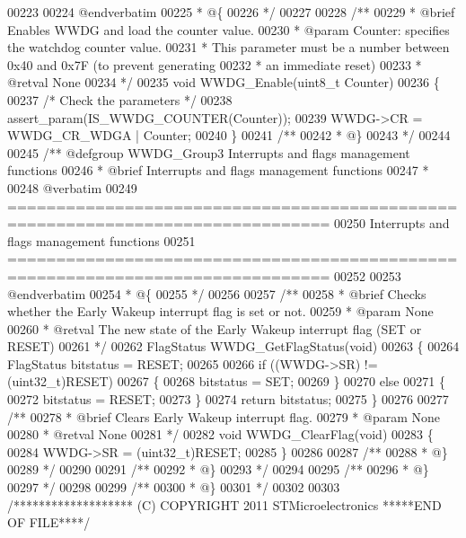 \begin{DoxyCode}
00223 \textcolor{comment}{}
00224 \textcolor{comment}{@endverbatim}
00225 \textcolor{comment}{  * @\{}
00226 \textcolor{comment}{  */}
00227 
00228 \textcolor{comment}{/**}
00229 \textcolor{comment}{  * @brief  Enables WWDG and load the counter value.                  }
00230 \textcolor{comment}{  * @param  Counter: specifies the watchdog counter value.}
00231 \textcolor{comment}{  *   This parameter must be a number between 0x40 and 0x7F (to prevent generating}
00232 \textcolor{comment}{  *   an immediate reset)}
00233 \textcolor{comment}{  * @retval None}
00234 \textcolor{comment}{  */}
00235 \textcolor{keywordtype}{void} WWDG_Enable(uint8\_t Counter)
00236 \{
00237   \textcolor{comment}{/* Check the parameters */}
00238   assert_param(IS\_WWDG\_COUNTER(Counter));
00239   WWDG->CR = WWDG_CR_WDGA | Counter;
00240 \}
00241 \textcolor{comment}{/**}
00242 \textcolor{comment}{  * @\}}
00243 \textcolor{comment}{  */}
00244 
00245 \textcolor{comment}{/** @defgroup WWDG\_Group3 Interrupts and flags management functions}
00246 \textcolor{comment}{ *  @brief   Interrupts and flags management functions }
00247 \textcolor{comment}{ *}
00248 \textcolor{comment}{@verbatim   }
00249 \textcolor{comment}{ ===============================================================================}
00250 \textcolor{comment}{                 Interrupts and flags management functions}
00251 \textcolor{comment}{ ===============================================================================  }
00252 \textcolor{comment}{}
00253 \textcolor{comment}{@endverbatim}
00254 \textcolor{comment}{  * @\{}
00255 \textcolor{comment}{  */}
00256 
00257 \textcolor{comment}{/**}
00258 \textcolor{comment}{  * @brief  Checks whether the Early Wakeup interrupt flag is set or not.}
00259 \textcolor{comment}{  * @param  None}
00260 \textcolor{comment}{  * @retval The new state of the Early Wakeup interrupt flag (SET or RESET)}
00261 \textcolor{comment}{  */}
00262 FlagStatus WWDG_GetFlagStatus(\textcolor{keywordtype}{void})
00263 \{
00264   FlagStatus bitstatus = RESET;
00265 
00266   \textcolor{keywordflow}{if} ((WWDG->SR) != (uint32\_t)RESET)
00267   \{
00268     bitstatus = SET;
00269   \}
00270   \textcolor{keywordflow}{else}
00271   \{
00272     bitstatus = RESET;
00273   \}
00274   \textcolor{keywordflow}{return} bitstatus;
00275 \}
00276 
00277 \textcolor{comment}{/**}
00278 \textcolor{comment}{  * @brief  Clears Early Wakeup interrupt flag.}
00279 \textcolor{comment}{  * @param  None}
00280 \textcolor{comment}{  * @retval None}
00281 \textcolor{comment}{  */}
00282 \textcolor{keywordtype}{void} WWDG_ClearFlag(\textcolor{keywordtype}{void})
00283 \{
00284   WWDG->SR = (uint32\_t)RESET;
00285 \}
00286 
00287 \textcolor{comment}{/**}
00288 \textcolor{comment}{  * @\}}
00289 \textcolor{comment}{  */}
00290 
00291 \textcolor{comment}{/**}
00292 \textcolor{comment}{  * @\}}
00293 \textcolor{comment}{  */}
00294 
00295 \textcolor{comment}{/**}
00296 \textcolor{comment}{  * @\}}
00297 \textcolor{comment}{  */}
00298 
00299 \textcolor{comment}{/**}
00300 \textcolor{comment}{  * @\}}
00301 \textcolor{comment}{  */}
00302 
00303 \textcolor{comment}{/******************* (C) COPYRIGHT 2011 STMicroelectronics *****END OF FILE****/}
\end{DoxyCode}
